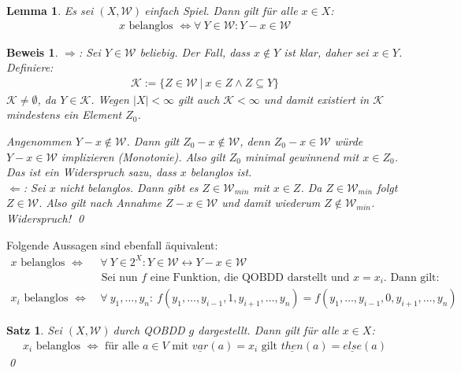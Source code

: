 \documentclass[ngerman]{scrartcl}
\theoremstyle{custom}
\newtheorem{ms}[mdef]{Satz}
\newtheorem{ml}[mdef]{Lemma}
\newtheorem*{bw}{Beweis}
\newcommand{\0}{\mathbf{0}}
\newcommand{\1}{\mathbf{L}}
\newcommand{\then}{\underline{then}}
\newcommand{\el}{\underline{else}}
\newcommand{\var}{\underline{var}}
\newcommand{\sg}{$(X,\mathcal{W})~$}
\newcommand{\W}{\mathcal{W}}
\begin{document}
\begin{ml}
Es sei \sg einfach Spiel. Dann gilt f\"ur alle $x \in X$:
\begin{align*}
x \text{ belanglos } \Leftrightarrow \forall~ Y \in \mathcal{W}: Y-x
\in \mathcal{W}
\end{align*}
\end{ml}

\begin{bw}
\glqq $\Rightarrow$\grqq: Sei $Y \in \W$ beliebig. Der Fall, dass $x
\not \in Y$ ist klar, daher sei $x \in Y$. Definiere:
\begin{align*}
\mathcal{K}:= \{ Z \in \W ~\vert~ x \in Z \wedge Z \subseteq Y \}
\end{align*}
$\mathcal{K} \not = \emptyset$, da $Y \in \mathcal{K}$. Wegen $\vert X
\vert < \infty$ gilt auch $\mathcal{K} < \infty$ und damit existiert
in $\mathcal{K}$ mindestens ein Element $Z_0$.

Angenommen $Y-x \not \in \W$. Dann gilt $Z_0-x \not \in \W$, denn
$Z_0-x \in \W$ w\"urde $Y-x \in \W$ implizieren (Monotonie). Also gilt
$Z_0$ minimal gewinnend mit $x \in Z_0$. Das ist ein Widerspruch sazu,
dass $x$ belanglos ist.\\
\glqq $\Leftarrow$\grqq: Sei $x$ nicht belanglos. Dann gibt es $Z \in
\W_{min}$ mit $x \in Z$. Da $Z \in \W_{min}$ folgt $Z \in \W$. Also
gilt nach Annahme $Z-x \in \W$ und damit wiederum $Z \not \in
\W_{min}$. Widerspruch!
\qed
\end{bw}

Folgende Aussagen sind ebenfall \"aquivalent:
\begin{align*}
x \text{ belanglos } \Leftrightarrow &~ \forall~ Y \in 2^X: Y \in \W
\leftrightarrow Y-x \in \W\\
&\text{ Sei nun } f \text{ eine Funktion, die QOBDD darstellt und }
x=x_i. \text{ Dann gilt: }\\
x_i \text{ belanglos } \Leftrightarrow &~ \forall~
y_1,\dots,y_n:~ f(y_1,\dots,y_{i-1},1,y_{i+1},\dots, y_n)=f(y_1,\dots,y_{i-1},0,y_{i+1},\dots,y_n)
\end{align*}

\begin{ms}
Sei \sg durch QOBDD $g$ dargestellt. Dann gilt f\"ur alle $x \in X$:
\begin{align*}
x_i \text{ belanglos } \Leftrightarrow \text{ f\"ur alle } a \in V
\text { mit } \var(a)=x_i \text{ gilt } \then(a) = \el(a)
\end{align*}
\qed
\end{ms}
\end{document}
